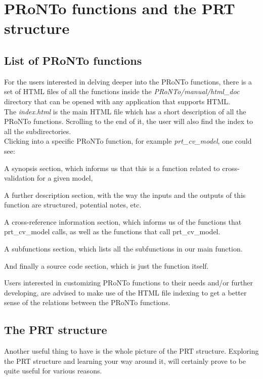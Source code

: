 \chapter{PRoNTo functions and the PRT structure}
\label{pronto_func_prt_struct}

\minitoc

\section{List of PRoNTo functions}

For the users interested in delving deeper into the PRoNTo functions, there is a set of HTML files of all the functions inside the \textit{PRoNTo/manual/html\_doc} directory that can be opened with any application that supports HTML.
\\

The \textit{index.html} is the main HTML file which has a short description of all the PRoNTo functions. Scrolling to the end of it, the user will also find the index to all the subdirectories.
\\

Clicking into a specific PRoNTo function, for example \textit{prt\_cv\_model}, one could see:

\bi
\item A synopsis section, which informs us that this is a function related to cross-validation for a given model,
\item A further description section, with the way the inputs and the outputs of this function are structured, potential notes, etc.
\item A cross-reference information section, which informs us of the functions that {prt\_cv\_model} calls, as well as the functions that call {prt\_cv\_model}.
\item A subfunctions section, which lists all the subfunctions in our main function.
\item And finally a source code section, which is just the function itself.
\ei

Users interested in customizing PRoNTo functions to their needs and/or further developing, are advised to make use of the HTML file indexing to get a better sense of the relations between the PRoNTo functions. 


\section{The PRT structure}

Another useful thing to have is the whole picture of the PRT structure. Exploring the PRT structure and learning your way around it, will certainly prove to be quite useful for various reasons.
\\

